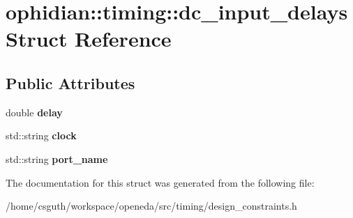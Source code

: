 \hypertarget{structophidian_1_1timing_1_1dc__input__delays}{\section{ophidian\-:\-:timing\-:\-:dc\-\_\-input\-\_\-delays Struct Reference}
\label{structophidian_1_1timing_1_1dc__input__delays}
}
\subsection*{Public Attributes}
\begin{DoxyCompactItemize}
\item 
\hypertarget{structophidian_1_1timing_1_1dc__input__delays_a495c673ee0ea14553af6119d4b0550b1}{double {\bfseries delay}}\label{structophidian_1_1timing_1_1dc__input__delays_a495c673ee0ea14553af6119d4b0550b1}

\item 
\hypertarget{structophidian_1_1timing_1_1dc__input__delays_a61e28999e032f27ba10fde0b7da9413b}{std\-::string {\bfseries clock}}\label{structophidian_1_1timing_1_1dc__input__delays_a61e28999e032f27ba10fde0b7da9413b}

\item 
\hypertarget{structophidian_1_1timing_1_1dc__input__delays_a8739ae9ee3c094a99bc51c04012d891d}{std\-::string {\bfseries port\-\_\-name}}\label{structophidian_1_1timing_1_1dc__input__delays_a8739ae9ee3c094a99bc51c04012d891d}

\end{DoxyCompactItemize}


The documentation for this struct was generated from the following file\-:\begin{DoxyCompactItemize}
\item 
/home/csguth/workspace/openeda/src/timing/design\-\_\-constraints.\-h\end{DoxyCompactItemize}
